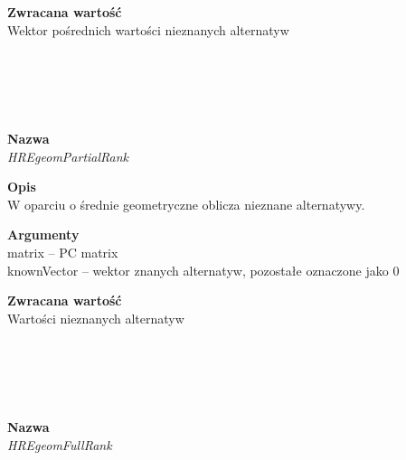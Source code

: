 \begin{spacing}{1.0}
\begin{spacing}{1.2}
\begin{spacing}{1.2}
\begin{spacing}{1.2}
\begin{spacing}{1.1}
\begin{spacing}{1.1}
\begin{spacing}{1.1}
\begin{spacing}{1.2}
\textbf{Zwracana wartość}\\ Wektor pośrednich wartości nieznanych alternatyw  \\ \begin{spacing}{0.3}  \end{spacing}


\\~\\ 
\begin{spacing}{1.2}
 \\ \begin{spacing}{0.5}  \end{spacing}

\textbf{Nazwa}\\  \emph{HREgeomPartialRank} \\ \begin{spacing}{0.3}  \end{spacing}
 
\textbf{Opis}\\ W oparciu o średnie geometryczne oblicza nieznane alternatywy. \\  \begin{spacing}{0.3}  \end{spacing}
 
\textbf{Argumenty} \\
matrix -- PC matrix \\
knownVector -- wektor znanych alternatyw, pozostałe oznaczone jako $0$ \\ \begin{spacing}{0.3}  \end{spacing}

\textbf{Zwracana wartość}\\ Wartości nieznanych alternatyw  \\ \begin{spacing}{0.3}  \end{spacing}


\\~\\ 
\begin{spacing}{1.2}
 \\ \begin{spacing}{0.5}  \end{spacing}

\textbf{Nazwa}\\  \emph{HREgeomFullRank} \\ \begin{spacing}{0.3}  \end{spacing}
 

\end{spacing}
\end{spacing}
\end{spacing}
\end{spacing}
\end{spacing}
\end{spacing}
\end{spacing}
\end{spacing}
\end{spacing}
\end{spacing}

